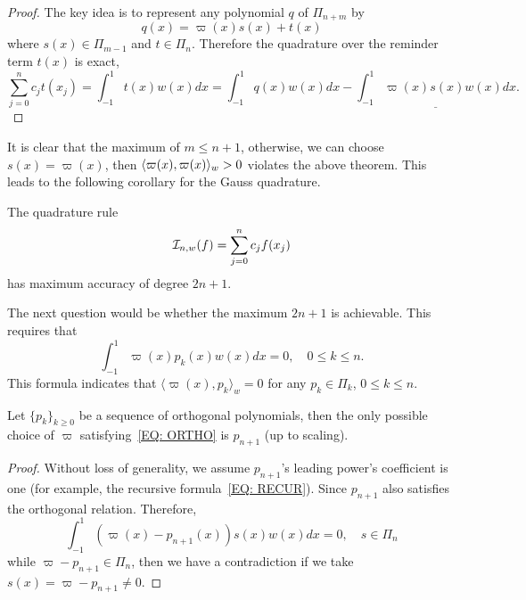 \begin{proof}
    The key idea is to represent any polynomial $q$ of $\Pi_{n+m}$ by 
    \begin{equation}
        q(x) = \varpi(x) s(x) + t(x)
    \end{equation}
    where $s(x)\in\Pi_{m-1}$ and $t\in \Pi_{n}$. Therefore the quadrature over the reminder term $t(x)$ is exact,
    \begin{equation}
        \sum_{j=0}^n c_j t(x_j) =  \int_{-1}^1 t(x) w(x) dx = \int_{-1}^1 q(x) w(x)dx - \underline{\int_{-1}^1 \varpi(x) s(x) w(x) dx}.
    \end{equation}
\end{proof}

It is clear that the maximum of $m \le n+1$, otherwise, we can choose $ s(x) = \varpi(x)$, then $\langle {\varpi(x), \varpi(x)} \rangle_w > 0$ violates the above theorem. This leads to the following corollary for the Gauss quadrature.

\begin{corollary}
    The quadrature rule 
    $$\mathcal I_{n, w}(f)=\sum_{j=0}^n c_j f(x_j)$$
    has maximum accuracy of degree $2n+1$. 
\end{corollary}

The next question would be whether the maximum $2n+1$ is achievable. This requires that
\begin{equation}\label{EQ: ORTHO}
    \int_{-1}^1 \varpi(x) p_k(x) w(x) dx = 0,\quad 0\le k\le n.
\end{equation}
This formula indicates that $\langle \varpi(x), p_k\rangle_w = 0$ for any $p_k\in \Pi_k$, $0\le k \le n$.

\begin{theorem}
\label{Thm: 3-GAU-ORT-POLY}
    Let $\{p_k\}_{k\ge 0}$ be a sequence of orthogonal polynomials, then the only possible choice of $\varpi$ satisfying~\eqref{EQ: ORTHO} is $p_{n+1}$ (up to scaling).
\end{theorem}

\begin{proof}
    Without loss of generality, we assume $p_{n+1}$'s leading power's coefficient is one (for example, the recursive formula~\eqref{EQ: RECUR}). Since $p_{n+1}$ also satisfies the orthogonal relation. Therefore,
    \begin{equation}
        \int_{-1}^1 (\varpi(x) - p_{n+1}(x)) s(x) w(x)dx = 0,\quad s\in\Pi_n
    \end{equation}
    while $\varpi - p_{n+1}\in\Pi_n$, then we have a contradiction if we take $s(x) = \varpi -  p_{n+1}\neq 0$. 
\end{proof}

